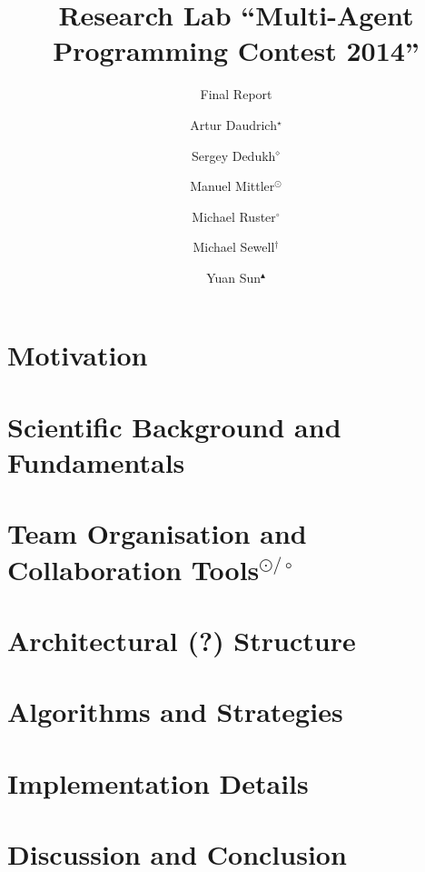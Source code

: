 \documentclass{../tech_reports/template/llncs}
\title{Research Lab \enquote{Multi-Agent Programming Contest 2014}}
\subtitle{Final Report}
\author{Artur Daudrich$^{\star}$ \and Sergey Dedukh$^{\diamond}$ \and Manuel Mittler$^{\odot}$ \and Michael Ruster$^{\circ}$ \and Michael Sewell$^{\dagger}$ \and Yuan Sun$^{\blacktriangle}$}
\institute{University of Koblenz-Landau, Koblenz Campus}
\begin{document}
\maketitle

\tableofcontents
\clearpage
{}

\section{Motivation}


\section{Scientific Background and Fundamentals}


\section[Team Organisation and Collaboration Tools]{Team Organisation and Collaboration Tools$^{\odot/\circ}$} %


\section{Architectural (?) Structure}


\section{Algorithms and Strategies}


\section{Implementation Details}


\section{Discussion and Conclusion}


%
%
\printbibliography
\end{document}
